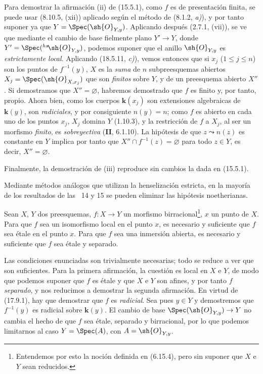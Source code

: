 Para demostrar la afirmación (ii) de (15.5.1), como $f$ es de presentación finita, se puede usar (8.10.5, (xii)) aplicado según el método de (8.1.2, \emph{a)}), y por tanto suponer ya que $Y=\Spec(\sh{O}_{Y,y})$. Aplicando después (2.7.1, (vii)), se ve que mediante el cambio de base fielmente plano $Y'\to Y$, donde $Y'=\Spec({}^{hs}\!\sh{O}_{Y,y})$, podemos suponer que el anillo $\sh{O}_{Y,y}$ es \emph{estrictamente local}. Aplicando (18.5.11, \emph{c)}), vemos entonces que si $x_j$ ($1\leq j\leq n$) son los puntos de $f^{-1}(y)$, $X$ es la \emph{suma} de $n$ subpreesquemas abiertos $X_j=\Spec(\sh{O}_{X,x_j})$ que son \emph{finitos} sobre $Y$, y de un preesquema abierto $X''$. Si demostramos que $X''=\varnothing$, habremos demostrado que $f$ es finito y, por tanto, propio. Ahora bien, como los cuerpos $\boldsymbol k(x_j)$ son extensiones algebraicas de $\boldsymbol k(y)$, son \emph{radiciales}, y por consiguiente $n(y)=n$; como $f$ es abierto en cada uno de los puntos $x_j$, $X_j$ domina $Y$ (1.10.3), y la restricción de $f$ a $X_j$, al ser un morfismo \emph{finito}, es \emph{sobreyectiva} (\textbf{II}, 6.1.10). La hipótesis de que $z\leadsto n(z)$ es constante en $Y$ implica por tanto que $X''\cap f^{-1}(z)=\varnothing$ para todo $z\in Y$, es decir, $X''=\varnothing$.

Finalmente, la demostración de (iii) reproduce sin cambios la dada en (15.5.1).

\begin{env}[18.10.17.2]
\label{IV.18.10.17.2}
Mediante métodos análogos que utilizan la henselización estricta, en la mayoría de los resultados de las \textsection\textsection~14 y 15 se pueden eliminar las hipótesis noetherianas.
\end{env}

\begin{lemma}[18.10.18]
\label{IV.18.10.18}
Sean $X$, $Y$ dos preesquemas, $f:X\to Y$ un morfismo birracional\footnote{Entendemos por esto la noción definida en (6.15.4), pero sin suponer que $X$ e $Y$ sean reducidos.}, $x$ un punto de $X$. Para que $f$ sea un isomorfismo local en el punto $x$, es necesario y suficiente que $f$ sea étale en el punto $x$. Para que $f$ sea una inmersión abierta, es necesario y suficiente que $f$ sea étale y separado.
\end{lemma}

Las condiciones enunciadas son trivialmente necesarias; todo se reduce a ver que son suficientes. Para la primera afirmación, la cuestión es local en $X$ e $Y$, de modo que podemos suponer que $f$ es étale y que $X$ e $Y$ son afines, y por tanto $f$ \emph{separado}, y nos reducimos a demostrar la segunda afirmación. En virtud de (17.9.1), hay que demostrar que $f$ es \emph{radicial}. Sea pues $y\in Y$ y demostremos que $f^{-1}(y)$ es radicial sobre $\boldsymbol k(y)$. El cambio de base $\Spec(\sh{O}_{Y,y})\to Y$ no cambia el hecho de que $f$ sea étale, separado y birracional, por lo que podemos limitarnos al caso $Y=\Spec(A)$, con $A=\sh{O}_{Y,y}$.

